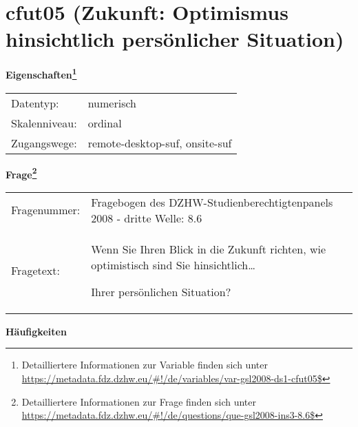 
    \setcounter{footnote}{0}

    \vspace*{-1.8cm}
	\section{cfut05 (Zukunft: Optimismus hinsichtlich persönlicher Situation)}
	\label{section:cfut05}



    \vspace*{0.5cm}
    \noindent\textbf{Eigenschaften\footnote{Detailliertere Informationen zur Variable finden sich unter
		\url{https://metadata.fdz.dzhw.eu/\#!/de/variables/var-gsl2008-ds1-cfut05$}}}\\
	\begin{tabularx}{\hsize}{@{}lX}
	Datentyp: & numerisch \\
	Skalenniveau: & ordinal \\
	Zugangswege: &
	  remote-desktop-suf, 
	  onsite-suf
 \\
    \end{tabularx}



				\vspace*{0.5cm}
                \noindent\textbf{Frage\footnote{Detailliertere Informationen zur Frage finden sich unter
		              \url{https://metadata.fdz.dzhw.eu/\#!/de/questions/que-gsl2008-ins3-8.6$}}}\\
				\begin{tabularx}{\hsize}{@{}lX}
					Fragenummer: &
					  Fragebogen des DZHW-Studienberechtigtenpanels 2008 - dritte Welle:
					  8.6
 \\
					Fragetext: & Wenn Sie Ihren Blick in die Zukunft richten, wie optimistisch sind Sie hinsichtlich…\par  Ihrer persönlichen Situation? \\
				\end{tabularx}





        		\vspace*{0.5cm}
                \noindent\textbf{Häufigkeiten}

